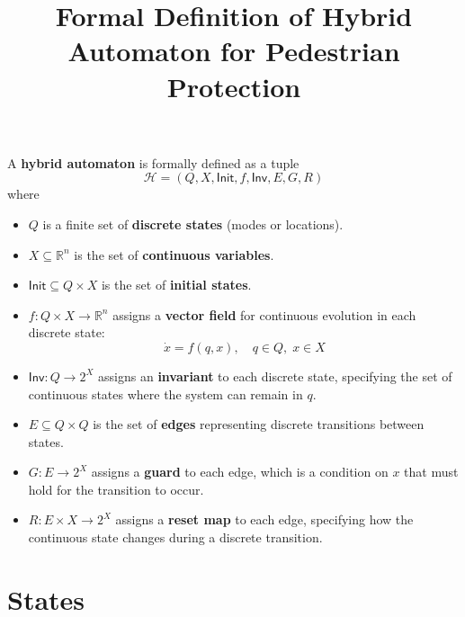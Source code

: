 \documentclass[12pt]{article}
\theoremstyle{definition}
\begin{document}
\title{Formal Definition of Hybrid Automaton for Pedestrian Protection}
\author{}
\date{}
\maketitle

A \textbf{hybrid automaton} is formally defined as a tuple
\[
\mathcal{H} = (Q, X, \mathsf{Init}, f, \mathsf{Inv}, E, G, R)
\]
where
\begin{itemize}
    \item $Q$ is a finite set of \textbf{discrete states} (modes or locations).
    \item $X \subseteq \mathbb{R}^n$ is the set of \textbf{continuous variables}.
    \item $\mathsf{Init} \subseteq Q \times X$ is the set of \textbf{initial states}.
    \item $f: Q \times X \to \mathbb{R}^n$ assigns a \textbf{vector field} for continuous evolution in each discrete state: 
    \[
    \dot{x} = f(q, x), \quad q \in Q, \; x \in X
    \]
    \item $\mathsf{Inv}: Q \to 2^X$ assigns an \textbf{invariant} to each discrete state, specifying the set of continuous states where the system can remain in $q$.
    \item $E \subseteq Q \times Q$ is the set of \textbf{edges} representing discrete transitions between states.
    \item $G: E \to 2^X$ assigns a \textbf{guard} to each edge, which is a condition on $x$ that must hold for the transition to occur.
    \item $R: E \times X \to 2^X$ assigns a \textbf{reset map} to each edge, specifying how the continuous state changes during a discrete transition.
\end{itemize}


\section{States}
\end{document}
